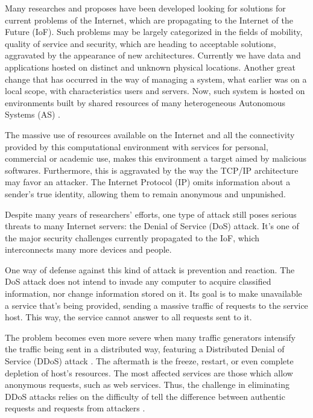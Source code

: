 
Many researches and proposes have been developed looking for solutions for current problems of the Internet, which are propagating to the Internet of the Future (IoF). Such problems may be largely categorized in the fields of mobility, quality of service and security, which are heading to acceptable solutions, aggravated by the appearance of new architectures. Currently we have data and applications hosted on distinct and unknown physical locations. Another great change that has occurred in the way of managing a system, what earlier was on a local scope, with characteristics users and servers. Now, such system is hosted on environments built by shared resources of many heterogeneous Autonomous Systems (AS) \cite{5486552}.

The massive use of resources available on the Internet and all the connectivity provided by this computational environment with services for personal, commercial or academic use, makes this environment a target aimed by malicious softwares. Furthermore, this is aggravated by the way the TCP/IP architecture may favor an attacker. The Internet Protocol (IP) omits information about a sender's true identity, allowing them to remain anonymous and unpunished. \cite{1039856}

Despite many years of researchers' efforts, one type of attack still poses serious threats to many Internet servers: the Denial of Service (DoS) attack. It's one of the major security challenges currently propagated to the IoF, which interconnects many more devices and people.

One way of defense against this kind of attack is prevention and reaction. The DoS attack does not intend to invade any computer to acquire classified information, nor change information stored on it. Its goal is to make unavailable a service that's being provided, sending a massive traffic of requests to the service host. This way, the service cannot answer to all requests sent to it.

The problem becomes even more severe when many traffic generators intensify the traffic being sent in a distributed way, featuring a Distributed Denial of Service (DDoS) attack \cite{Sachdeva08ddosincidents}. The aftermath is the freeze, restart, or even complete depletion of host's resources. The most affected services are those which allow anonymous requests, such as web services. Thus, the challenge in eliminating DDoS attacks relies on the difficulty of tell the difference between authentic requests and requests from attackers \cite{Li:2009:DDA:1683304.1684620}.

